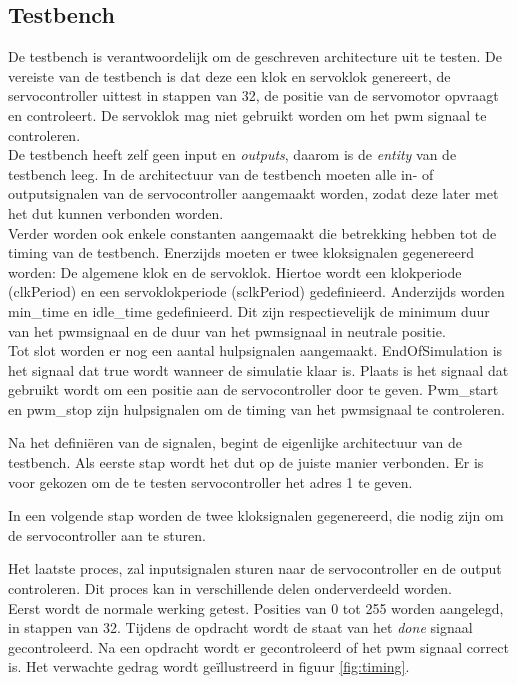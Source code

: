 \subsection{Testbench}

De testbench is verantwoordelijk om de geschreven architecture uit te testen. De vereiste van de testbench is dat deze een klok en servoklok genereert, de servocontroller uittest in stappen van 32, de positie van de servomotor opvraagt en controleert. De servoklok mag niet gebruikt worden om het \gls{pwm} signaal te controleren.\\

\noindent
De testbench heeft zelf geen input en \textit{outputs}, daarom is de \textit{entity} van de testbench leeg. In de architectuur van de testbench moeten alle in- of outputsignalen  van de servocontroller aangemaakt worden, zodat deze later met het \gls{dut} kunnen verbonden worden.\\

\noindent
Verder worden ook enkele constanten aangemaakt die betrekking hebben tot de timing van de testbench. Enerzijds moeten er twee kloksignalen gegenereerd worden: De algemene klok en de servoklok. Hiertoe wordt een klokperiode (clkPeriod) en een servoklokperiode (sclkPeriod) gedefinieerd. Anderzijds worden min\_time en idle\_time gedefinieerd. Dit zijn respectievelijk de minimum duur van het \gls{pwm}signaal en de duur van het \gls{pwm}signaal in neutrale positie.\\

\noindent
Tot slot worden er nog een aantal hulpsignalen aangemaakt. EndOfSimulation is het signaal dat true wordt wanneer de simulatie klaar is. Plaats is het signaal dat gebruikt wordt om een positie aan de servocontroller door te geven. Pwm\_start en pwm\_stop zijn hulpsignalen om de timing van het \gls{pwm}signaal te controleren. 


Na het defini\"{e}ren van de signalen, begint de eigenlijke architectuur van de testbench. Als eerste stap wordt het \gls{dut} op de juiste manier verbonden. Er is voor gekozen om de te testen servocontroller het adres 1 te geven.


In een volgende stap worden de twee kloksignalen gegenereerd, die nodig zijn om de servocontroller aan te sturen.

Het laatste proces, zal inputsignalen sturen naar de servocontroller en de output controleren. Dit proces kan in verschillende delen onderverdeeld worden.\\
\noindent
Eerst wordt de normale werking getest. Posities van 0 tot 255 worden aangelegd, in stappen van 32. Tijdens de opdracht wordt de staat van het \textit{done} signaal gecontroleerd. Na een opdracht wordt er gecontroleerd of het \gls{pwm} signaal correct is. Het verwachte gedrag wordt ge\"{i}llustreerd in figuur \ref{fig:timing}.\\

